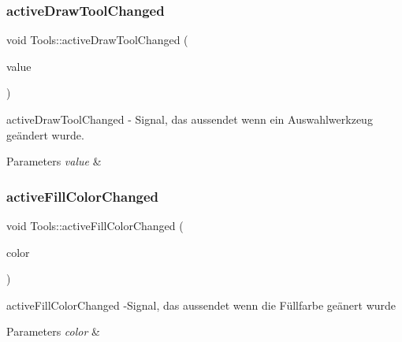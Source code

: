 \subsubsection{\texorpdfstring{active\+Draw\+Tool\+Changed}{activeDrawToolChanged}}
{\footnotesize\ttfamily void Tools\+::active\+Draw\+Tool\+Changed (\begin{DoxyParamCaption}\item[{const \hyperlink{class_tools_ab031688a77e89a80ce8b5db7014684a3}{Tools\+::\+Draw\+Tool} \&}]{value }\end{DoxyParamCaption})\hspace{0.3cm}{\ttfamily [signal]}}



active\+Draw\+Tool\+Changed -\/ Signal, das aussendet wenn ein Auswahlwerkzeug geändert wurde. 


\begin{DoxyParams}{Parameters}
{\em value} & \\
\hline
\end{DoxyParams}
\mbox{\label{class_tools_a1330acf72b4e751cb873d6538cc5ef2d}} 
\subsubsection{\texorpdfstring{active\+Fill\+Color\+Changed}{activeFillColorChanged}}
{\footnotesize\ttfamily void Tools\+::active\+Fill\+Color\+Changed (\begin{DoxyParamCaption}\item[{Q\+Color}]{color }\end{DoxyParamCaption})\hspace{0.3cm}{\ttfamily [signal]}}



active\+Fill\+Color\+Changed -\/\+Signal, das aussendet wenn die Füllfarbe geänert wurde 


\begin{DoxyParams}{Parameters}
{\em color} & \\
\hline
\end{DoxyParams}
\mbox{\label{class_tools_a6ea189495868e06c89d79b36d09b43d7}} 

